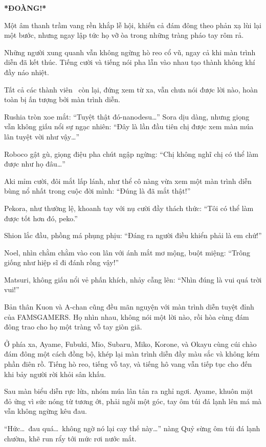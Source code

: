 \documentclass[../main.tex]{subfiles}
\begin{document}
\textbf{*ĐOÀNG!*}

Một âm thanh trầm vang rền khắp lễ hội, khiến cả đám đông theo phản xạ lùi lại một bước, nhưng ngay lập tức họ vỡ òa trong những tràng pháo tay rôm rả.

Những người xung quanh vẫn không ngừng hò reo cổ vũ, ngay cả khi màn trình diễn đã kết thúc. Tiếng cười và tiếng nói pha lẫn vào nhau tạo thành không khí đầy náo nhiệt.

Tất cả các thành viên \hll\ còn lại, đứng xem từ xa, vẫn chưa nói được lời nào, hoàn toàn bị ấn tượng bởi màn trình diễn.

Rushia tròn xoe mắt: ``Tuyệt thật đó-nanodesu\dots'' Sora dịu dàng, nhưng giọng vẫn không giấu nổi sự ngạc nhiên: ``Đây là lần đầu tiên chị được xem màn múa lân tuyệt vời như vậy\dots''

Roboco gật gù, giọng điệu pha chút ngập ngừng: ``Chị không nghĩ chị có thể làm được như họ đâu\dots''

Aki mỉm cười, đôi mắt lấp lánh, như thể cô nàng vừa xem một màn trình diễn bùng nổ nhất trong cuộc đời mình: ``Đúng là đã mắt thật!''

Pekora, như thường lệ, khoanh tay với nụ cười đầy thách thức: ``Tôi có thể làm được tốt hơn đó, peko.''

Shion lắc đầu, phồng má phụng phịu: ``Đáng ra người điều khiển phải là em chứ!''

Noel, nhìn chằm chằm vào con lân với ánh mắt mơ mộng, buột miệng: ``Trông giống như hiệp sĩ đi đánh rồng vậy!''

Matsuri, không giấu nổi vẻ phấn khích, nhảy cẫng lên: ``Nhìn đúng là vui quá trời vui!''

Bản thân Kuon và A-chan cũng đều mãn nguyện với màn trình diễn tuyệt đỉnh của FAMSGAMERS. Họ nhìn nhau, không nói một lời nào, rồi hòa cùng đám đông trao cho họ một tràng vỗ tay giòn giã.

Ở phía xa, Ayame, Fubuki, Mio, Subaru, Miko, Korone, và Okayu cùng cúi chào đám đông một cách đồng bộ, khép lại màn trình diễn đầy màu sắc và không kém phần điên rồ. Tiếng hò reo, tiếng vỗ tay, và tiếng hô vang vẫn tiếp tục cho đến khi bảy người rời khỏi sân khấu.

\ct

Sau màn biểu diễn rực lửa, nhóm múa lân tản ra nghỉ ngơi. Ayame, khuôn mặt đỏ ửng vì sức nóng từ tương ớt, phải ngồi một góc, tay ôm túi đá lạnh lên má mà vẫn không ngừng kêu đau.

``Hức\dots\ đau quá\dots\ không ngờ nó lại cay thế này\dots'' nàng Quỷ sừng ôm túi đá lạnh chườm, khẽ run rẩy tới mức rơi nước mắt.
\end{document}
